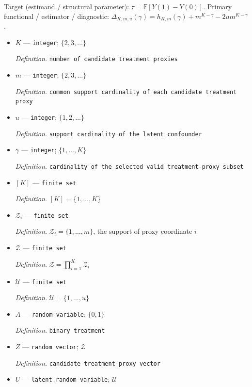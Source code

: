 \documentclass{article}
\begin{document}
Target (estimand / structural parameter): \(\tau=\mathbb E[Y(1)-Y(0)]\).
Primary functional / estimator / diagnostic: \(\Delta_{K,m,u}(\gamma)=h_{K,m}(\gamma)+m^{K-\gamma}-2u m^{K-\gamma}\).
\begin{itemize}
  \item \(K\) --- \texttt{integer}; \(\{2,3,\ldots\}\)
  \par\smallskip\noindent\emph{Definition.} \texttt{number of candidate treatment proxies}
  \item \(m\) --- \texttt{integer}; \(\{2,3,\ldots\}\)
  \par\smallskip\noindent\emph{Definition.} \texttt{common support cardinality of each candidate treatment proxy}
  \item \(u\) --- \texttt{integer}; \(\{1,2,\ldots\}\)
  \par\smallskip\noindent\emph{Definition.} \texttt{support cardinality of the latent confounder}
  \item \(\gamma\) --- \texttt{integer}; \(\{1,\ldots,K\}\)
  \par\smallskip\noindent\emph{Definition.} \texttt{cardinality of the selected valid treatment-\allowbreak{}proxy subset}
  \item \([K]\) --- \texttt{finite set}
  \par\smallskip\noindent\emph{Definition.} \([K]=\{1,\ldots,K\}\)
  \item \(\mathcal Z_i\) --- \texttt{finite set}
  \par\smallskip\noindent\emph{Definition.} \(\mathcal Z_i=\{1,\ldots,m\}\), the support of proxy coordinate \(i\)
  \item \(\mathcal Z\) --- \texttt{finite set}
  \par\smallskip\noindent\emph{Definition.} \(\mathcal Z=\prod_{i=1}^K\mathcal Z_i\)
  \item \(\mathcal U\) --- \texttt{finite set}
  \par\smallskip\noindent\emph{Definition.} \(\mathcal U=\{1,\ldots,u\}\)
  \item \(A\) --- \texttt{random variable}; \(\{0,1\}\)
  \par\smallskip\noindent\emph{Definition.} \texttt{binary treatment}
  \item \(Z\) --- \texttt{random vector}; \(\mathcal Z\)
  \par\smallskip\noindent\emph{Definition.} \texttt{candidate treatment-\allowbreak{}proxy vector}
  \item \(U\) --- \texttt{latent random variable}; \(\mathcal U\)

\end{itemize}
\end{document}
